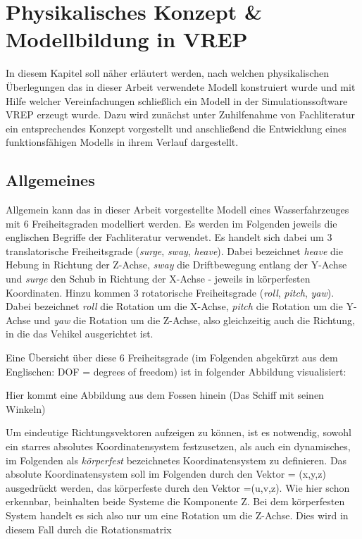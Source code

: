 %
\chapter{Physikalisches Konzept & Modellbildung in VREP}
In diesem Kapitel soll näher erläutert werden, nach welchen physikalischen Überlegungen das in dieser Arbeit verwendete Modell konstruiert wurde und mit Hilfe welcher Vereinfachungen schließlich ein Modell in der Simulationssoftware VREP erzeugt wurde. 
Dazu wird zunächst unter Zuhilfenahme von Fachliteratur ein entsprechendes Konzept vorgestellt und anschließend die Entwicklung eines funktionsfähigen Modells in ihrem Verlauf dargestellt.
%
\section{Allgemeines}
%
Allgemein kann das in dieser Arbeit vorgestellte Modell eines Wasserfahrzeuges mit 6 Freiheitsgraden modelliert werden. Es werden im Folgenden jeweils die englischen Begriffe der Fachliteratur verwendet. Es handelt sich dabei um 3 translatorische Freiheitsgrade (\textit{surge}, \textit{sway}, \textit{heave}). Dabei bezeichnet \textit{heave} die Hebung in Richtung der Z-Achse, \textit{sway} die Driftbewegung entlang der Y-Achse und \textit{surge} den Schub in Richtung der X-Achse - jeweils in körperfesten Koordinaten. 
Hinzu kommen 3 rotatorische Freiheitsgrade (\textit{roll}, \textit{pitch}, \textit{yaw}). Dabei bezeichnet \textit{roll} die Rotation um die X-Achse, \textit{pitch} die Rotation um die Y-Achse und \textit{yaw} die Rotation um die Z-Achse, also gleichzeitig auch die Richtung, in die das Vehikel ausgerichtet ist. 

Eine Übersicht über diese 6 Freiheitsgrade (im Folgenden abgekürzt aus dem Englischen: DOF = degrees of freedom) ist in folgender Abbildung visualisiert:


Hier kommt eine Abbildung aus dem Fossen hinein (Das Schiff mit seinen Winkeln)



Um eindeutige Richtungsvektoren aufzeigen zu können, ist es notwendig, sowohl ein starres absolutes Koordinatensystem festzusetzen, als auch ein dynamisches, im Folgenden als \textit{körperfest} bezeichnetes Koordinatensystem zu definieren. 
Das absolute Koordinatensystem soll im Folgenden durch den Vektor \textbf{\textit{\eta}} = (x,y,z) ausgedrückt werden, das körperfeste durch den Vektor \nu =(u,v,z). Wie hier schon erkennbar, beinhalten beide Systeme die Komponente Z. Bei dem körperfesten System handelt es sich also nur um eine Rotation um die Z-Achse. Dies wird in diesem Fall durch die Rotationsmatrix 

